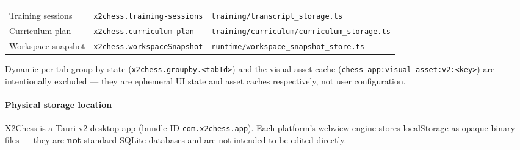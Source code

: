 \documentclass[]{article}
\let\oldparagraph\paragraph
\renewcommand{\paragraph}[1]{\oldparagraph{#1}\mbox{}}
\begin{document}
\begin{longtable}[]{@{}lll@{}}
\begin{minipage}[t]{0.05\columnwidth}
\end{minipage}\tabularnewline
\begin{minipage}[t]{0.05\columnwidth}\raggedright\strut
Training sessions\strut
\end{minipage} & \begin{minipage}[t]{0.05\columnwidth}\raggedright\strut
\texttt{x2chess.training-sessions}\strut
\end{minipage} & \begin{minipage}[t]{0.05\columnwidth}\raggedright\strut
\texttt{training/transcript\_storage.ts}\strut
\end{minipage}\tabularnewline
\begin{minipage}[t]{0.05\columnwidth}\raggedright\strut
Curriculum plan\strut
\end{minipage} & \begin{minipage}[t]{0.05\columnwidth}\raggedright\strut
\texttt{x2chess.curriculum-plan}\strut
\end{minipage} & \begin{minipage}[t]{0.05\columnwidth}\raggedright\strut
\texttt{training/curriculum/curriculum\_storage.ts}\strut
\end{minipage}\tabularnewline
\begin{minipage}[t]{0.05\columnwidth}\raggedright\strut
Workspace snapshot\strut
\end{minipage} & \begin{minipage}[t]{0.05\columnwidth}\raggedright\strut
\texttt{x2chess.workspaceSnapshot}\strut
\end{minipage} & \begin{minipage}[t]{0.05\columnwidth}\raggedright\strut
\texttt{runtime/workspace\_snapshot\_store.ts}\strut
\end{minipage}\tabularnewline
\bottomrule
\end{longtable}

Dynamic per-tab group-by state
(\texttt{x2chess.groupby.\textless{}tabId\textgreater{}}) and the
visual-asset cache
(\texttt{chess-app:visual-asset:v2:\textless{}key\textgreater{}}) are
intentionally excluded --- they are ephemeral UI state and asset caches
respectively, not user configuration.

\paragraph{Physical storage location}\label{physical-storage-location}

X2Chess is a Tauri v2 desktop app (bundle ID \texttt{com.x2chess.app}).
Each platform's webview engine stores localStorage as opaque binary
files --- they are \textbf{not} standard SQLite databases and are not
intended to be edited directly.
\end{document}
